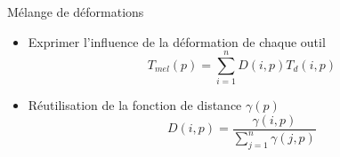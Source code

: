 \documentclass[xcolor=x11names,compress]{beamer}
\renewcommand{\(}{\begin{columns}} \renewcommand{\)}{\end{columns}}
\newcommand{\<}[1]{\begin{column}{#1}} \renewcommand{\>}{\end{column}}
\begin{document}

\begin{frame}{Mélange de déformations}
  \begin{itemize}
    \item Exprimer l'influence de la déformation de chaque outil
    \begin{displaymath}
      T_{mel}(p) = \sum_{i=1}^n D(i, p) T_{d}(i, p)
    \end{displaymath}
    \item Réutilisation de la fonction de distance $\gamma(p)$
    \begin{displaymath}
      D(i, p) = \frac{\gamma(i,p)}{\sum_{j=1}^n \gamma(j,p)}
    \end{displaymath}
  \end{itemize}
\end{frame}
\end{document}
